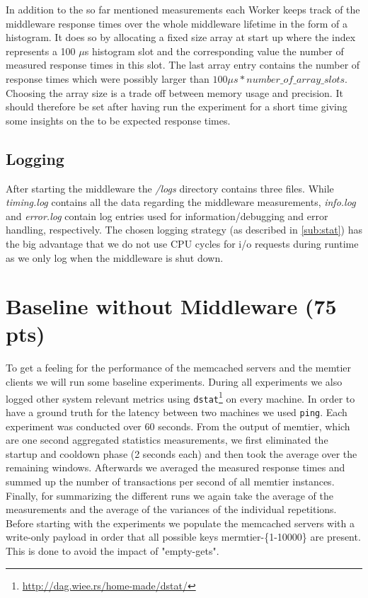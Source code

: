 \documentclass[11pt,a4paper]{article}
\let\ti\textit
\let\tt\texttt
\begin{document}
 In addition to the so far mentioned measurements each Worker keeps track of the middleware response times over the whole middleware lifetime in the form of a histogram. It does so by allocating a fixed size array at start up where the index represents a 100 $\mu$s histogram slot and the corresponding value the number of measured response times in this slot. The last array entry contains the number of response times which were possibly larger than $100\mu s * number\_of\_array\_slots$. Choosing the array size is a trade off between memory usage and precision. It should therefore be set after having run the experiment for a short time giving some insights on the to be expected response times.

 
\subsection{Logging}
After starting the middleware the \ti{/logs} directory contains three files. While \ti{timing.log} contains all the data regarding the middleware measurements, \ti{info.log} and \ti{error.log} contain log entries used for information/debugging and error handling, respectively. The chosen logging strategy (as described in \ref{sub:stat}) has the big advantage that we do not use CPU cycles for i/o requests during runtime as we only log when the middleware is shut down.




\section{Baseline without Middleware (75 pts)}\label{sec:bl_without_mw}

To get a feeling for the performance of the memcached servers and the memtier clients we will run some baseline experiments. During all experiments we also logged other system relevant metrics using \tt{dstat}\footnote{\url{http://dag.wiee.rs/home-made/dstat/}} on every machine. In order to have a ground truth for the latency between two machines we used \tt{ping}.
Each experiment was conducted over 60 seconds. From the output of memtier, which are one second aggregated statistics measurements, we first eliminated the startup and cooldown phase (2 seconds each) and then took the average over the remaining windows. Afterwards we averaged the measured response times and summed up the number of transactions per second of all memtier instances. Finally, for summarizing the different runs we again take the average of the measurements and the average of the variances of the individual repetitions.
Before starting with the experiments we populate the memcached servers with a write-only payload in order that all possible keys mermtier-\{1-10000\} are present. This is done to avoid the impact of "empty-gets".
\end{document}
